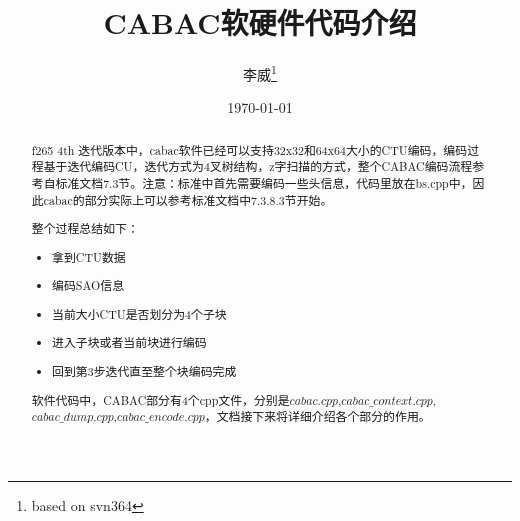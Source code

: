 \documentclass[UTF8,a4paper,12pt]{ctexart}
\title{\textbf{\Large{CABAC软硬件代码介绍}}}
\author{ 李威\thanks{based on svn364} }
\date{\today}
\begin{document}
 
\maketitle
 
\begin{abstract}
f265 4th 迭代版本中，cabac软件已经可以支持32x32和64x64大小的CTU编码，编码过程基于迭代编码CU，迭代方式为4叉树结构，z字扫描的方式，整个CABAC编码流程参考自标准文档7.3节\cite{ref1}。注意：标准中首先需要编码一些头信息，代码里放在bs.cpp中，因此cabac的部分实际上可以参考标准文档中7.3.8.3节开始。

整个过程总结如下：
\begin{itemize}[itemindent=25pt]
\item [1)] 拿到CTU数据
\item [2)] 编码SAO信息
\item [3)] 当前大小CTU是否划分为4个子块
\item [4)] 进入子块或者当前块进行编码
\item [5)] 回到第3步迭代直至整个块编码完成
\end{itemize}

软件代码中，CABAC部分有4个cpp文件，分别是$cabac.cpp$,$cabac\_context.cpp$, \\
$cabac\_dump.cpp$,$cabac\_encode.cpp$，文档接下来将详细介绍各个部分的作用。


\end{abstract}
 
 
 
 
\end{document}
